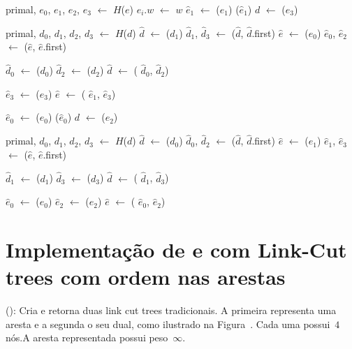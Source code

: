 \begin{algorithm}[htb]
\caption{\MSFupdate($H$, $e$, $w$)}
\label{Algo:MSFupdate}
\begin{algorithmic}[1]
\State primal, $e_0$, $e_1$, $e_2$, $e_3$ $\gets$ $H$($e$)
\State $e_i.w$ $\gets$ $w$
\EndFor
{}\label{Algo:MSFupdate:linhauvinF}
\State $\hat e_1$ $\gets$ \LCOFindNode($e_1$)
\State \LCOEvert($\hat e_1$)
\State $d$ $\gets$ \LCOMin($e_3$)

\State primal, $d_0$, $d_1$, $d_2$, $d_3$ $\gets$ $H$($d$)
\State $\hat d$ $\gets$ \LCOFindNode($d_1$)
\State $\hat d_1$, $\hat d_3$ $\gets$ \LCOSplit($\hat d$, $\hat d$.first)
\State $\hat e$ $\gets$ \LCOFindNode($e_0$)
\State $\hat e_0$, $\hat e_2$ $\gets$ \LCOSplit($\hat e$, $\hat e$.first)


\State $\hat d_0$ $\gets$ \LCOFindNode($d_0$)
\State $\hat d_2$ $\gets$ \LCOFindNode($d_2$)
\State $\hat d$ $\gets$ \LCOMerge( $\hat d_0$, $\hat d_2$)

\State $\hat e_3$ $\gets$ \LCOFindNode($e_3$)
\State $\hat e$ $\gets$ \LCOMerge( $\hat e_1$, $\hat e_3$)

\EndIf

\Else

\State $\hat e_0$ $\gets$ \LCOFindNode($e_0$)
\State \LCOEvert($\hat e_0$)
\State $d$ $\gets$ \LCOMax($e_2$)

\State primal, $d_0$, $d_1$, $d_2$, $d_3$ $\gets$ $H$($d$)
\State $\hat d$ $\gets$ \LCOFindNode($d_0$)
\State $\hat d_0$, $\hat d_2$ $\gets$ \LCOSplit($\hat d$, $\hat d$.first)
\State $\hat e$ $\gets$ \LCOFindNode($e_1$)
\State $\hat e_1$, $\hat e_3$ $\gets$ \LCOSplit($\hat e$, $\hat e$.first)


\State $\hat d_1$ $\gets$ \LCOFindNode($d_1$)
\State $\hat d_3$ $\gets$ \LCOFindNode($d_3$)
\State $\hat d$ $\gets$ \LCOMerge( $\hat d_1$, $\hat d_3$)

\State $\hat e_0$ $\gets$ \LCOFindNode($e_0$)
\State $\hat e_2$ $\gets$ \LCOFindNode($e_2$)
\State $\hat e$ $\gets$ \LCOMerge( $\hat e_0$, $\hat e_2$)




\EndIf
\EndIf
\end{algorithmic}
\end{algorithm}

\section{Implementação de \LCOSplice{} e \LCOMakeEdge{} com Link-Cut trees com ordem nas arestas}
\LCOMakeEdge(): Cria e retorna duas link cut trees tradicionais. A primeira representa uma aresta e a segunda o seu dual, como ilustrado na Figura~. Cada uma possui~$4$ nós.A aresta representada possui peso~$\infty$.



